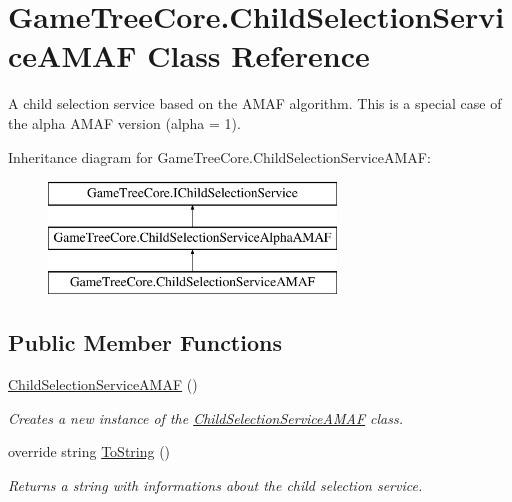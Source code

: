 \hypertarget{class_game_tree_core_1_1_child_selection_service_a_m_a_f}{}\section{Game\+Tree\+Core.\+Child\+Selection\+Service\+A\+M\+AF Class Reference}
\label{class_game_tree_core_1_1_child_selection_service_a_m_a_f}


A child selection service based on the A\+M\+AF algorithm. This is a special case of the alpha A\+M\+AF version (alpha = 1).  


Inheritance diagram for Game\+Tree\+Core.\+Child\+Selection\+Service\+A\+M\+AF\+:\begin{figure}[H]
\begin{center}
\leavevmode
\includegraphics[height=3.000000cm]{class_game_tree_core_1_1_child_selection_service_a_m_a_f}
\end{center}
\end{figure}
\subsection*{Public Member Functions}
\begin{DoxyCompactItemize}
\item 
\mbox{\hyperlink{class_game_tree_core_1_1_child_selection_service_a_m_a_f_a3dfbd210da9fcf10fd87fdda9015f1b0}{Child\+Selection\+Service\+A\+M\+AF}} ()
\begin{DoxyCompactList}\small\item\em Creates a new instance of the \mbox{\hyperlink{class_game_tree_core_1_1_child_selection_service_a_m_a_f}{Child\+Selection\+Service\+A\+M\+AF}} class. \end{DoxyCompactList}\item 
override string \mbox{\hyperlink{class_game_tree_core_1_1_child_selection_service_a_m_a_f_aac59ed66cb99284d847efe69dbe62b22}{To\+String}} ()
\begin{DoxyCompactList}\small\item\em Returns a string with informations about the child selection service. \end{DoxyCompactList}\end{DoxyCompactItemize}


